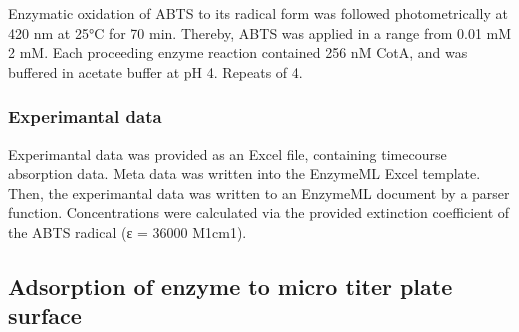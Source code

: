 \documentclass[letterpaper,10pt,english]{jupyterBook}
\begin{document}
\sphinxAtStartPar
{}Enzymatic oxidation of ABTS to its radical form was followed photometrically at 420 nm at 25°C for 70 min.
Thereby, ABTS was applied in a range from 0.01 mM \sphinxhyphen{} 2 mM. Each proceeding enzyme reaction contained 256 nM CotA, and was buffered in acetate buffer at pH 4.
Repeats of 4.


\subsubsection{Experimantal data}
\label{\detokenize{scenarios/enzyme_inactivation:experimantal-data}}
\sphinxAtStartPar
Experimantal data was provided as an Excel file, containing time\sphinxhyphen{}course absorption data. Meta data was written into the EnzymeML Excel template. Then, the experimantal data was written to an EnzymeML document by a parser function. Concentrations were calculated via the provided extinction coefficient of the ABTS radical (ε = 36000 M\sphinxhyphen{}1cm\sphinxhyphen{}1).


\subsection{Adsorption of enzyme to micro titer plate surface}
\label{\detokenize{scenarios/enzyme_inactivation:adsorption-of-enzyme-to-micro-titer-plate-surface}}
\end{document}

